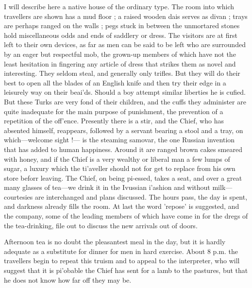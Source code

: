 \documentclass[25pt, a4paper]{article}
\begin{document}
	I will describe here a native house of the ordinary type. The room into which travellers are shown has a mud floor ; a raised wooden dais serves as divan ; trays are perhaps ranged on the walls ; pegs stuck in between the unmortared stones hold miscellaneous odds and ends of saddlery or dress. The visitors are at first left to their own devices, as far as men can be said to be left who are surrounded by an eager but respectful mob, the grown-up members of which have not the least hesitation in fingering any article of dress that strikes them as novel and interesting. They seldom steal, and generally only trifles. But they will do their best to open all the blades of an English knife and then try their edge in a leisurely way on their beai'ds. Should a boy attempt similar liberties he is cufied. But these Turks are very fond of their children, and the cuffs they administer are quite inadequate for the main purpose of punishment, the prevention of a repetition of the off'ence. Presently there is a stir, and the Chief, who has absented himself, reappears, followed by a servant bearing a stool and a tray, on which—welcome sight !— is the steaming samovar, the one Russian invention that has added to human happiness. Around it are ranged brown cakes smeared with honey, and if the Chief is a very wealthy or liberal man a few lumps of sugar, a luxury which the ti'aveller should not for get to replace from his own store beforr leaving. The Chief, on being pi-essed, takes a seat, and over a great many glasses of tea—we drink it in the Ivussian i'ashion and without milk— courtesies are interchanged and plans discussed. The hours pass, the day is spent, and darkness already fills the room. At last the word 'repose' is suggested, and the company, some of the leading members of which have come in for the dregs of the tea-drinking, file out to discuss the new arrivals out of doors.
	
	Afternoon tea is no doubt the pleasantest meal in the day, but it is hardly adequate as a substitute for dinner for men in hard exercise. About 8 p.m. the travellers begin to repeat this truism and to appeal to the interpreter, who will suggest that it is pi'obable the Chief has sent for a lamb to the pastures, but that he does not know how far off they may be.
	
\end{document}
